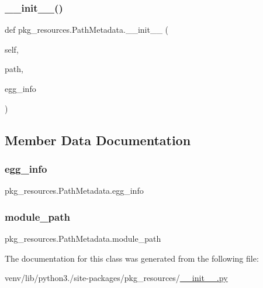 \subsubsection{\texorpdfstring{\+\_\+\+\_\+init\+\_\+\+\_\+()}{\_\_init\_\_()}}
{\footnotesize\ttfamily def pkg\+\_\+resources.\+Path\+Metadata.\+\_\+\+\_\+init\+\_\+\+\_\+ (\begin{DoxyParamCaption}\item[{}]{self,  }\item[{}]{path,  }\item[{}]{egg\+\_\+info }\end{DoxyParamCaption})}



\subsection{Member Data Documentation}
\mbox{\label{classpkg__resources_1_1PathMetadata_a61a445362a417dfb470ebee020a73762}} 
\subsubsection{\texorpdfstring{egg\+\_\+info}{egg\_info}}
{\footnotesize\ttfamily pkg\+\_\+resources.\+Path\+Metadata.\+egg\+\_\+info}

\mbox{\label{classpkg__resources_1_1PathMetadata_a32d4f91934149b639e6b3e88e802bd9f}} 
\subsubsection{\texorpdfstring{module\+\_\+path}{module\_path}}
{\footnotesize\ttfamily pkg\+\_\+resources.\+Path\+Metadata.\+module\+\_\+path}



The documentation for this class was generated from the following file\+:\begin{DoxyCompactItemize}
\item 
venv/lib/python3./site-\/packages/pkg\+\_\+resources/\hyperlink{venv_2lib_2python3_89_2site-packages_2pkg__resources_2____init_____8py}{\+\_\+\+\_\+init\+\_\+\+\_\+.\+py}\end{DoxyCompactItemize}
